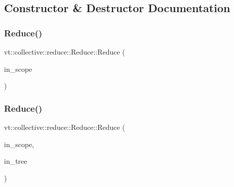 \subsection{Constructor \& Destructor Documentation}
\mbox{\label{structvt_1_1collective_1_1reduce_1_1_reduce_a5e5a3c0e00259bec5aad517aeaba36ac}} 
\subsubsection{\texorpdfstring{Reduce()}{Reduce()}\hspace{0.1cm}{\footnotesize\ttfamily [1/2]}}
{\footnotesize\ttfamily vt\+::collective\+::reduce\+::\+Reduce\+::\+Reduce (\begin{DoxyParamCaption}\item[{\hyperlink{structvt_1_1collective_1_1reduce_1_1detail_1_1_reduce_scope}{detail\+::\+Reduce\+Scope} const \&}]{in\+\_\+scope }\end{DoxyParamCaption})\hspace{0.3cm}{\ttfamily [explicit]}}

\mbox{\label{structvt_1_1collective_1_1reduce_1_1_reduce_a346fd6b262828a501c342330fc091fec}} 
\subsubsection{\texorpdfstring{Reduce()}{Reduce()}\hspace{0.1cm}{\footnotesize\ttfamily [2/2]}}
{\footnotesize\ttfamily vt\+::collective\+::reduce\+::\+Reduce\+::\+Reduce (\begin{DoxyParamCaption}\item[{\hyperlink{structvt_1_1collective_1_1reduce_1_1detail_1_1_reduce_scope}{detail\+::\+Reduce\+Scope} const \&}]{in\+\_\+scope,  }\item[{\hyperlink{structvt_1_1collective_1_1tree_1_1_tree}{collective\+::tree\+::\+Tree} $\ast$}]{in\+\_\+tree }\end{DoxyParamCaption})}



